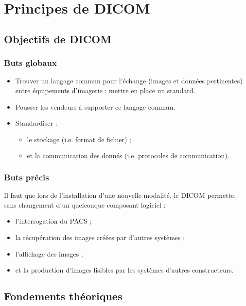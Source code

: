 \section{Principes de DICOM}

	\subsection{Objectifs de DICOM}
	
	\frame
	{
		\frametitle{Buts globaux}
		\begin{itemize}
			\item Trouver un langage commun pour l'\'echange (images et donn\'ees pertinentes) entre \'equipements d'imagerie : mettre en place un standard.
			\item Pousser les vendeurs \`a supporter ce langage commun.
			\item Standardiser :
			\begin{itemize}
				\item le stockage (i.e. format de fichier) ;
				\item et la communication des donn\'es (i.e. protocoles de communication).
			\end{itemize}
		\end{itemize}
	}
	
	\frame
	{
		\frametitle{Buts pr\'ecis}
		
		Il faut que lors de l'installation d'une nouvelle modalit\'e, le DICOM permette, sans changement d'un quelconque composant logiciel :
		\begin{itemize}
			\item l'interrogation du PACS ;
			\item la r\'ecup\'eration des images cr\'e\'ees par d'autres syst\`emes ;
			\item l'affichage des images ;
			\item et la production d'images lisibles par les syst\`emes d'autres constructeurs.
		\end{itemize}
	}

	\subsection{Fondements th\'eoriques}

